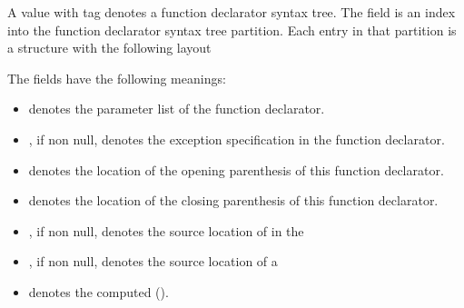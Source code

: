 A  value with tag  denotes a function declarator syntax tree.
The  field is an index into the function declarator syntax tree partition.
Each entry in that partition is a structure with the following layout
%
\begin{figure}[H]
	\centering
	\label{fig:ifc:SyntaxSort:FunctionDeclarator}
\end{figure}
%
The fields have the following meanings:
\begin{itemize}
	\item {} denotes the parameter list of the function declarator.
	\item {}, if non null, denotes the exception specification in the function declarator.
	\item {} denotes the location of the opening parenthesis of this function declarator.
	\item {} denotes the location of the closing parenthesis of this function declarator.
	\item {}, if non null, denotes the source location of  in the 
	\item {}, if non null, denotes the source location of a 
	\item {} denotes the computed  ().
\end{itemize}


\subsection{}
\label{sec:ifc:SyntaxSort:ArrayOrFunctionDeclarator}


